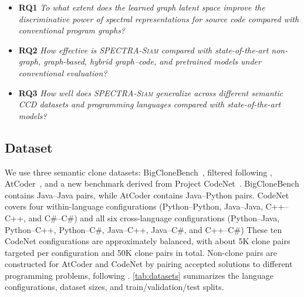 \documentclass[final,5p,times,twocolumn]{elsarticle}
\newcommand{\method}{\textsc{SPECTRA-Siam}}
\theoremstyle{plain}
\begin{document}
\begin{itemize}[leftmargin=*]
\item \textbf{RQ1}
\emph{To what extent does the learned graph latent space improve the discriminative power of spectral representations for source code compared with conventional program graphs?}

\item \textbf{RQ2}
\emph{How effective is \method{} compared with state-of-the-art non-graph, graph-based, hybrid graph--code, and pretrained models under conventional evaluation?}

\item \textbf{RQ3}
\emph{How well does \method{} generalize across different semantic CCD datasets and programming languages compared with state-of-the-art models?}

\end{itemize}

\subsection{Dataset}
\label{sec:revised_datasets}
We use three semantic clone datasets: BigCloneBench~\cite{svajlenko2014bigclonebench}, filtered following \cite{wang2020faast}, AtCoder~\cite{perez2019crosslang}, and a new benchmark derived from Project CodeNet~\cite{puri2021codenet}. BigCloneBench contains Java--Java pairs, while AtCoder contains Java--Python pairs. CodeNet covers four within-language configurations (Python--Python, Java--Java, C++--C++, and C\#--C\#) and all six cross-language configurations (Python--Java, Python--C++, Python--C\#, Java--C++, Java--C\#, and C++--C\#) These ten CodeNet configurations are approximately balanced, with about 5K clone pairs targeted per configuration and 50K clone pairs in total. Non-clone pairs are constructed for AtCoder and CodeNet by pairing accepted solutions to different programming problems, following \cite{perez2019crosslang}. \autoref{tab:datasets} summarizes the language configurations, dataset sizes, and train/validation/test splits.
\end{document}
